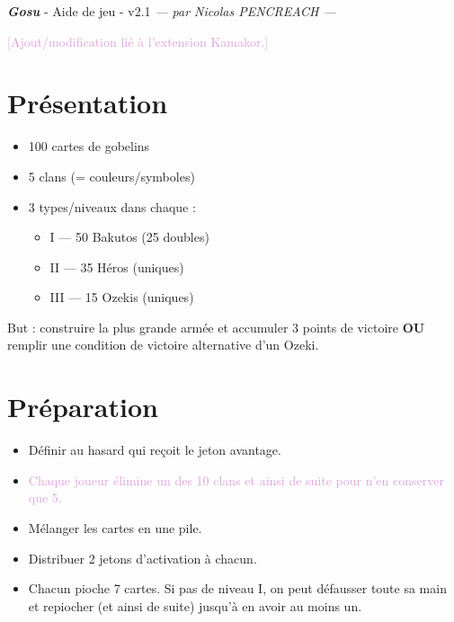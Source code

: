 \documentclass[10pt, a4paper]{article}	%
\begin{document}
{\LARGE \textbf{\textit{Gosu}}}
{\large - Aide de jeu - v2.1}\textit{ — par Nicolas PENCREACH —}

\setlength{\columnseprule}{0.005cm}	%
\begin{multicols}{3}				%

\textcolor{Plum}{[Ajout/modification lié à l’extension Kamakor.]}

\section{Présentation}
\label{sec:presentation}

\begin{itemize}
	\item 100 cartes de gobelins
	\item 5 clans (= couleurs/symboles)
	\item 3 types/niveaux dans chaque :
	\begin{itemize}
		\item I   — 50 Bakutos (25 doubles)
		\item II  — 35 Héros (uniques)
		\item III — 15 Ozekis (uniques)
	\end{itemize}
\end{itemize}


But : construire la plus grande armée et accumuler 3 points de victoire \textbf{OU} remplir une condition de victoire alternative d’un Ozeki.


\section{Préparation}
\label{sec:preparation}

\begin{itemize}
	\item Définir au hasard qui reçoit le jeton avantage.
	\item \textcolor{Plum}{Chaque joueur élimine un des 10 clans et ainsi de suite pour n’en conserver que 5.}
	\item Mélanger les cartes en une pile.
	\item Distribuer 2 jetons d’activation à chacun.
	\item Chacun pioche 7 cartes. Si pas de niveau I, on peut défausser toute sa main et repiocher (et ainsi de suite) jusqu’à en avoir au moins un.
\end{itemize}



\end{multicols}
\end{document}
